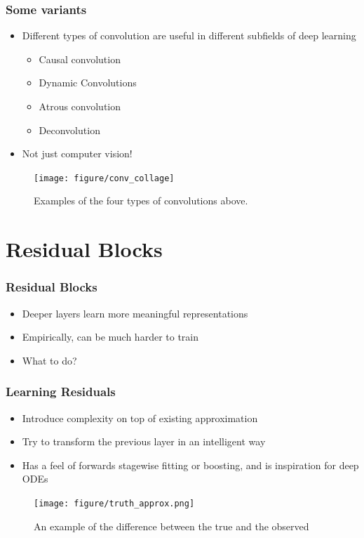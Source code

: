 \documentclass[10pt,mathserif]{beamer}
\begin{document}
\begin{frame}
  \frametitle{Some variants}
  \begin{itemize}
  \item Different types of convolution are useful in different subfields of deep
    learning
    \begin{itemize}
    \item Causal convolution \citep{van2016wavenet}
    \item Dynamic Convolutions \citep{kalchbrenner2014convolutions}
    \item Atrous convolution \citep{chen2018deeplab}
    \item Deconvolution \citep{ronneberger2015u}
    \end{itemize}
  \item Not just computer vision!
  \end{itemize}
  \begin{figure}[ht]
    \centering
    \texttt{[image: figure/conv\_collage]}
    \caption{Examples of the four types of convolutions above. \label{fig:conv_collage} }
  \end{figure}
\end{frame}

\section{Residual Blocks}
\label{sec:residual_layers}

\begin{frame}
  \frametitle{Residual Blocks}
  \begin{itemize}
  \item Deeper layers learn more meaningful representations
  \item Empirically, can be much harder to train
  \item What to do?
  \end{itemize}
\end{frame}

\begin{frame}
  \frametitle{Learning Residuals}
  \begin{itemize}
  \item Introduce complexity on top of existing approximation
  \item Try to transform the previous layer in an intelligent way
  \item Has a feel of forwards stagewise fitting or boosting, and is inspiration
    for deep ODEs
  \end{itemize}
\begin{figure}[ht]
  \centering
  \texttt{[image: figure/truth\_approx.png]}
  \caption{An example of the difference between the true and the
    observed \label{fig:truth_approx} }
\end{figure}
\end{frame}
\end{document}
